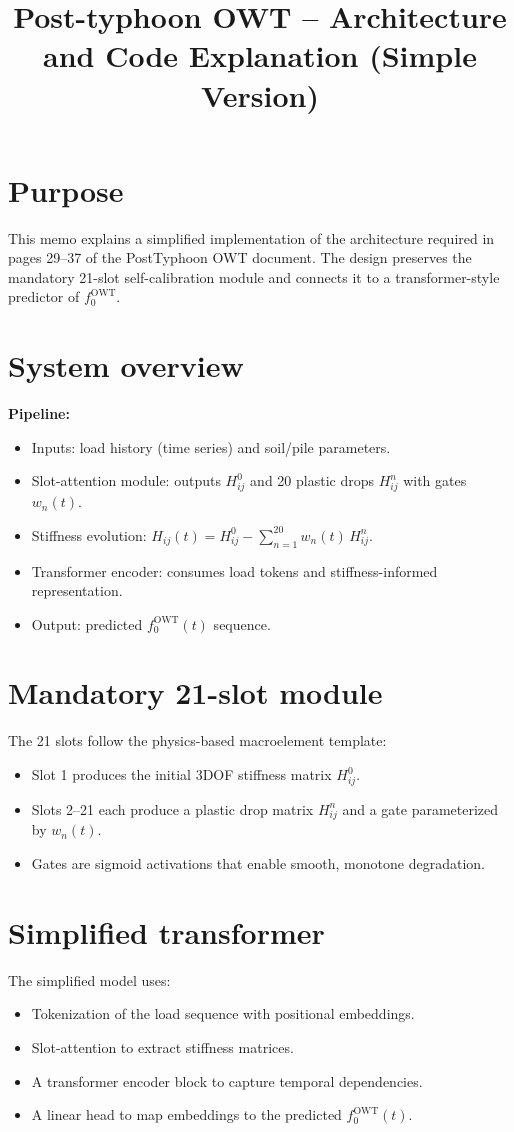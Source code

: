 \documentclass[11pt]{article}
\title{Post-typhoon OWT -- Architecture and Code Explanation (Simple Version)}
\author{}
\date{}
\begin{document}
\maketitle

\section{Purpose}
This memo explains a simplified implementation of the architecture required in pages 29--37 of the
PostTyphoon OWT document. The design preserves the mandatory 21-slot self-calibration module and
connects it to a transformer-style predictor of $f_0^{\mathrm{OWT}}$.

\section{System overview}
\textbf{Pipeline:}
\begin{itemize}
  \item Inputs: load history (time series) and soil/pile parameters.
  \item Slot-attention module: outputs $H_{ij}^0$ and 20 plastic drops $H_{ij}^n$ with gates $w_n(t)$.
  \item Stiffness evolution: $H_{ij}(t) = H_{ij}^0 - \sum_{n=1}^{20} w_n(t)\,H_{ij}^n$.
  \item Transformer encoder: consumes load tokens and stiffness-informed representation.
  \item Output: predicted $f_0^{\mathrm{OWT}}(t)$ sequence.
\end{itemize}

\section{Mandatory 21-slot module}
The 21 slots follow the physics-based macroelement template:
\begin{itemize}
  \item Slot 1 produces the initial 3DOF stiffness matrix $H_{ij}^0$.
  \item Slots 2--21 each produce a plastic drop matrix $H_{ij}^n$ and a gate parameterized by $w_n(t)$.
  \item Gates are sigmoid activations that enable smooth, monotone degradation.
\end{itemize}

\section{Simplified transformer}
The simplified model uses:
\begin{itemize}
  \item Tokenization of the load sequence with positional embeddings.
  \item Slot-attention to extract stiffness matrices.
  \item A transformer encoder block to capture temporal dependencies.
  \item A linear head to map embeddings to the predicted $f_0^{\mathrm{OWT}}(t)$.
\end{itemize}
\end{document}
